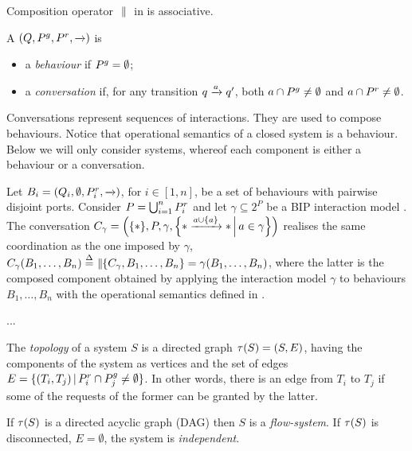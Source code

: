 \begin{proposition}
  \label{prop:associativity}
  Composition operator $\compose$ in  is associative.
\end{proposition}

\begin{definition}
  \label{defn:components}
  A \compmodel{} $(Q, \pin, \pout, \goesto{})$ is
  \begin{itemize}
  \item a \emph{behaviour} if $\pin  = \emptyset$;
  \item a \emph{conversation} if, for any transition $q \goesto{a} q'$, both
    $a \cap \pin \neq \emptyset$ and $a \cap \pout \neq \emptyset$.
  \end{itemize}
\end{definition}

Conversations represent sequences of interactions. They are used to compose
behaviours.  Notice that operational semantics of a closed system is a
behaviour.  Below we will only consider systems, whereof each component is
either a behaviour or a conversation.

\begin{example}
  \label{ex:bip}
  Let $B_i = (Q_i, \emptyset, \pout_i, \goesto{})$, for $i \in [1,n]$, be a
  set of behaviours with pairwise disjoint ports.  Consider $P =
  \bigcup_{i=1}^n \pout_i$ and let $\gamma \subseteq 2^P$ be a BIP
  interaction model \cite{BliSif07-acp-emsoft}.  The conversation $C_\gamma
  = \Big(\{*\}, P, \gamma, \Setdef{* \goesto{a\cup\{a\}} *}{a \in
    \gamma}\Big)$ realises the same coordination as the one imposed by
  $\gamma$, \ie $C_\gamma(B_1, \dots, B_n) \bydef{=} \compose[\{C_\gamma,
    B_1, \dots, B_n\}] = \gamma(B_1, \dots, B_n)$, where the latter is the
  composed component obtained by applying the interaction model $\gamma$ to
  behaviours $B_1, \dots, B_n$ with the operational semantics defined in
  \cite{BliSif07-acp-emsoft}.
\end{example}

\begin{example}
  \label{ex:network}
  ...
\end{example}

\begin{definition}[Topologies]
  \label{defn:topology}
  The \emph{topology} of a system $S$ is a directed graph $\topo{S} = (S,
  E)$, having the components of the system as vertices and the set of edges
  $E = \setdef{(T_i,T_j)}{\pout_i \cap \pin_j \neq \emptyset}$.  In other
  words, there is an edge from $T_i$ to $T_j$ if some of the requests of
  the former can be granted by the latter.

  If $\topo{S}$ is a directed acyclic graph (DAG) then $S$ is a
  \emph{flow-system}.  If $\topo{S}$ is disconnected, \ie $E = \emptyset$,
  the system is \emph{independent}.
\end{definition}

